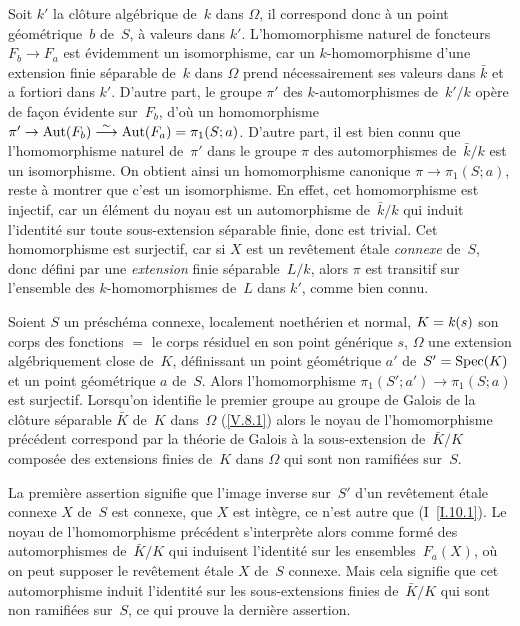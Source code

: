 Soit $k'$ la cl\^oture alg\'ebrique de~$k$ dans $\Omega$, il
correspond donc \`a un point g\'eom\'etrique~$b$ de~$S$, \`a
valeurs dans $k'$. L'homomorphisme naturel de foncteurs $F_b\to F_a$
est \'evidemment un isomorphisme, car un $k$-homomorphisme d'une
extension finie s\'eparable de~$k$ dans $\Omega$ prend
n\'ecessairement ses valeurs dans $\bar{k}$ et a fortiori dans
$k'$. D'autre part, le groupe $\pi'$ des $k$-automorphismes de~$k'/k$
op\`ere de fa\c con \'evidente sur~$F_b$, d'o\`u un
homomorphisme $\pi'\to \Aut(F_b)\isomto \Aut(F_a)=\pi_1(S;a)$.
D'autre part, il est bien connu que l'homomorphisme naturel de~$\pi'$
dans le groupe $\pi$ des automorphismes de~$\bar{k}/k$ est un
isomorphisme. On obtient ainsi un homomorphisme canonique $\pi\to
\pi_1(S;a)$, reste \`a montrer que c'est un isomorphisme. En effet,
cet homomorphisme est injectif, car un \'el\'ement du noyau est un
automorphisme de~$\bar{k}/k$ qui induit l'identit\'e sur toute
sous-extension s\'eparable finie, donc est trivial. Cet
homomorphisme est surjectif, car si $X$ est un rev\^etement
\'etale \emph{connexe} de~$S$, donc d\'efini par une
\emph{extension} finie s\'eparable~$L/k$, alors $\pi$ est transitif
sur l'ensemble des $k$-homomorphismes de~$L$ dans $k'$, comme bien
connu.

\begin{proposition}
\label{V.8.2}
Soient $S$ un pr\'esch\'ema connexe, localement noeth\'erien et
normal, $K=\mathit{k}(s)$ son corps des fonctions $=$ le corps r\'esiduel en
son point g\'en\'erique $s$, $\Omega$ une extension
alg\'ebriquement close de~$K$, d\'efinissant un point
g\'eom\'etrique $a'$ de~$S'=\operatorname{Spec}(K)$ et un point
g\'eom\'etrique $a$ de~$S$. Alors l'homomorphisme
$\pi_1(S';a')\to\pi_1(S;a)$ est surjectif. Lorsqu'on identifie le
premier groupe au groupe de Galois de la cl\^oture s\'eparable
$\bar{K}$ de~$K$ dans~$\Omega$ (\cf \ref{V.8.1}) alors le noyau de
l'homomorphisme pr\'ec\'edent correspond par la th\'eorie de
Galois \`a la sous-extension de~$\bar{K}/K$ compos\'ee des
extensions finies de~$K$ dans $\Omega$ qui sont non ramifi\'ees sur~$S$.
\end{proposition}

La premi\`ere assertion signifie que l'image inverse sur~$S'$ d'un
rev\^etement \'etale connexe $X$ de~$S$ est connexe, \ie que $X$
est int\`egre, ce n'est autre que (I~\ref{I.10.1}). Le noyau de
l'homomorphisme pr\'ec\'edent s'interpr\`ete alors comme
form\'e des automorphismes de~$\bar{K}/K$ qui induisent
l'identit\'e sur les ensembles~$F_a(X)$,
o\`u on peut supposer le rev\^etement \'etale $X$ de~$S$
connexe. Mais cela signifie que cet automorphisme induit
l'identit\'e sur les sous-extensions finies de~$\bar{K}/K$ qui sont
non ramifi\'ees sur~$S$, ce qui prouve la derni\`ere assertion.

